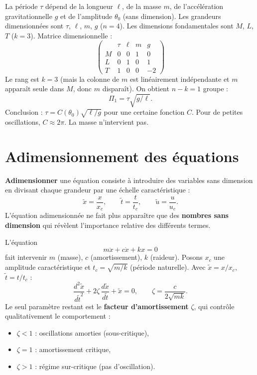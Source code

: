 \begin{exemple}
La p\'eriode $\tau$ d\'epend de la longueur $\ell$, de la masse $m$,
de l'acc\'el\'eration gravitationnelle $g$ et de l'amplitude $\theta_0$
(sans dimension).  Les grandeurs dimensionn\'ees sont $\tau$, $\ell$,
$m$, $g$ ($n=4$).  Les dimensions fondamentales sont $M$, $L$, $T$
($k=3$).  Matrice dimensionnelle :
\[
  \begin{pmatrix}
    & \tau & \ell & m & g \\
    M & 0 & 0 & 1 & 0 \\
    L & 0 & 1 & 0 & 1 \\
    T & 1 & 0 & 0 & -2
  \end{pmatrix}
\]
Le rang est $k=3$ (mais la colonne de $m$ est lin\'eairement
ind\'ependante et $m$ appara\^it seule dans $M$, donc $m$ dispara\^it).
On obtient $n-k=1$ groupe :
\[
  \Pi_1 = \tau \sqrt{g/\ell}.
\]
Conclusion : $\tau = C(\theta_0)\sqrt{\ell/g}$ pour une certaine
fonction $C$.  Pour de petites oscillations, $C\approx 2\pi$.
La masse n'intervient pas.
\end{exemple}

\section{Adimensionnement des \'equations}
\label{sec:adimensionnement}

\begin{definition}[Adimensionnement]
\textbf{Adimensionner} une \'equation consiste \`a introduire des
variables sans dimension en divisant chaque grandeur par une
\'echelle caract\'eristique :
\[
  \tilde{x} = \frac{x}{x_c}, \qquad
  \tilde{t} = \frac{t}{t_c}, \qquad
  \tilde{u} = \frac{u}{u_c}.
\]
L'\'equation adimensionn\'ee ne fait plus appara\^itre que des
\textbf{nombres sans dimension} qui r\'ev\`elent l'importance relative
des diff\'erents termes.
\end{definition}

\begin{exemple}
L'\'equation
\[
  m\ddot{x} + c\dot{x} + kx = 0
\]
fait intervenir $m$ (masse), $c$ (amortissement), $k$ (raideur).
Posons $x_c$ une amplitude caract\'eristique et $t_c=\sqrt{m/k}$
(p\'eriode naturelle).  Avec $\tilde{x}=x/x_c$,
$\tilde{t}=t/t_c$ :
\[
  \frac{d^2\tilde{x}}{d\tilde{t}^2}
  + 2\zeta\,\frac{d\tilde{x}}{d\tilde{t}}
  + \tilde{x} = 0,
  \qquad \zeta = \frac{c}{2\sqrt{mk}}.
\]
Le seul param\`etre restant est le \textbf{facteur d'amortissement}
$\zeta$, qui contr\^ole qualitativement le comportement :
\begin{itemize}
  \item $\zeta < 1$ : oscillations amorties (sous-critique),
  \item $\zeta = 1$ : amortissement critique,
  \item $\zeta > 1$ : r\'egime sur-critique (pas d'oscillation).
\end{itemize}
\end{exemple}

